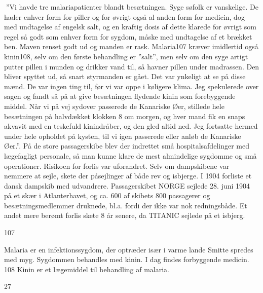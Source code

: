 ''Vi havde tre malariapatienter blandt besætningen. Syge søfolk er
vanskelige. De hader enhver form for piller og for øvrigt også al anden
form for medicin, dog med undtagelse af engelsk salt, og en kraftig
dosis af dette klarede for øvrigt som regel så godt som enhver form for
sygdom, måske med undtagelse af et brækket ben. Maven renset godt ud og
manden er rask. Malaria107 kræver imidlertid også kinin108, selv om den
første behandling er ''salt'', men selv om den syge artigt putter pillen
i munden og drikker vand til, så havner pillen under madrassen. Den
bliver spyttet ud, så snart styrmanden er gået. Det var ynkeligt at se
på disse mænd. De var ingen ting til, før vi var oppe i køligere klima.
Jeg spekulerede over sagen og fandt så på at give besætningen flydende
kinin som forebyggende middel. Når vi på vej sydover passerede de
Kanariske Øer, stillede hele besætningen på halvdækket klokken 8 om
morgen, og hver mand fik en snaps akvavit med en teskefuld kinindråber,
og den gled altid ned. Jeg fortsatte hermed under hele opholdet på
kysten, til vi igen passerede eller anløb de Kanariske Øer.''. På de
store passagerskibe blev der indrettet små hospitalsafdelinger med
lægefagligt personale, så man kunne klare de mest almindelige sygdomme
og små operationer. Risikoen for forlis var uforandret. Selv om
dampskibene var nemmere at sejle, skete der påsejlinger af både rev og
isbjerge. I 1904 forliste et dansk dampskib med udvandrere.
Passagerskibet NORGE sejlede 28. juni 1904 på et skær i Atlanterhavet,
og ca. 600 af skibets 800 passagerer og besætningsmedlemmer druknede,
bl.a. fordi der ikke var nok redningsbåde. Et andet mere berømt forlis
skete 8 år senere, da TITANIC sejlede på et isbjerg.

107

Malaria er en infektionssygdom, der optræder især i varme lande Smitte
spredes med myg. Sygdommen behandles med kinin. I dag findes forbyggende
medicin. 108 Kinin er et lægemiddel til behandling af malaria.

27
